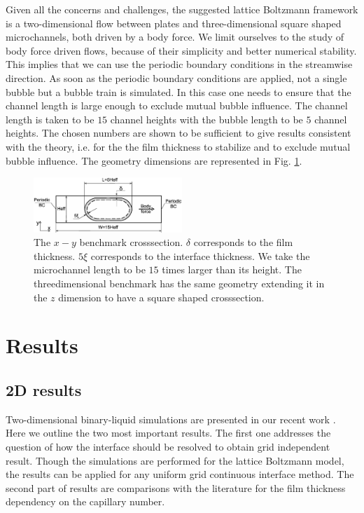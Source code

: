 \documentclass{CFD2011}
\begin{document}
Given all the concerns and challenges, the suggested lattice Boltzmann framework
is a two-dimensional flow between plates and three-dimensional square
shaped microchannels, both driven by a body force. We limit ourselves to the study
of body force driven flows, because of their simplicity and better numerical stability. 
This
implies that we can use the periodic boundary conditions in the streamwise direction. As soon as the
periodic boundary
conditions are applied, not a single bubble but a bubble train is simulated. In this case one
needs
to ensure that the channel length is large enough to exclude mutual bubble influence.  The
channel length is taken to be $15$ channel heights with the bubble length to be $5$ channel
heights. The chosen numbers are shown to be sufficient to give results consistent with the theory,
i.e. for the the film thickness to stabilize and to exclude mutual bubble influence. The geometry
dimensions are represented in Fig. \ref{fig:benchmark:sketch}.
\begin{figure}[ht]
\includegraphics[width=0.5\textwidth]{Figures/benchmark.eps}
\caption{The $x-y$ benchmark crosssection. $\delta$ corresponds to the film thickness. $5\xi$
corresponds to the interface thickness. We take the microchannel length to be $15$ times larger than
its height. The threedimensional benchmark has the same geometry extending it in the $z$ dimension
to have a
square shaped crosssection.
\label{fig:benchmark:sketch}}
\end{figure}

\section{Results}
\subsection{2D results}
Two-dimensional binary-liquid simulations are presented in our recent work
\cite{kuzmin-binary2d}. Here we outline the two most important results. The first one addresses the
question of how the interface should be resolved to obtain grid independent result. Though the
simulations are performed for the lattice Boltzmann model, the results can be applied for any
uniform grid continuous interface method. The second part of results are comparisons with the
literature for the film thickness dependency on the capillary number.
 
\end{document}
